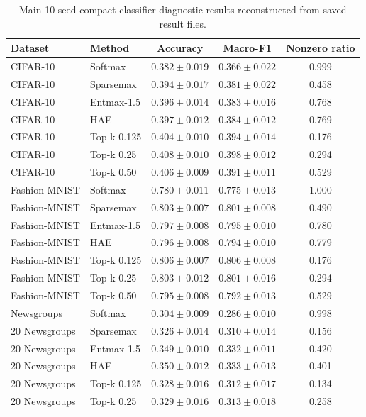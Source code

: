 \begin{table}[!t]
\centering
\small
\caption{Main 10-seed compact-classifier diagnostic results reconstructed from saved result files.}
\label{tab:main-results}
\begin{tabular}{@{}llccc@{}}
\toprule
Dataset & Method & Accuracy & Macro-F1 & Nonzero ratio \\
\midrule
CIFAR-10 & Softmax & $0.382 \pm 0.019$ & $0.366 \pm 0.022$ & 0.999 \\
CIFAR-10 & Sparsemax & $0.394 \pm 0.017$ & $0.381 \pm 0.022$ & 0.458 \\
CIFAR-10 & Entmax-1.5 & $0.396 \pm 0.014$ & $0.383 \pm 0.016$ & 0.768 \\
CIFAR-10 & HAE & $0.397 \pm 0.012$ & $0.384 \pm 0.012$ & 0.769 \\
CIFAR-10 & Top-k 0.125 & $0.404 \pm 0.010$ & $0.394 \pm 0.014$ & 0.176 \\
CIFAR-10 & Top-k 0.25 & $0.408 \pm 0.010$ & $0.398 \pm 0.012$ & 0.294 \\
CIFAR-10 & Top-k 0.50 & $0.406 \pm 0.009$ & $0.391 \pm 0.011$ & 0.529 \\
\addlinespace
Fashion-MNIST & Softmax & $0.780 \pm 0.011$ & $0.775 \pm 0.013$ & 1.000 \\
Fashion-MNIST & Sparsemax & $0.803 \pm 0.007$ & $0.801 \pm 0.008$ & 0.490 \\
Fashion-MNIST & Entmax-1.5 & $0.797 \pm 0.008$ & $0.795 \pm 0.010$ & 0.780 \\
Fashion-MNIST & HAE & $0.796 \pm 0.008$ & $0.794 \pm 0.010$ & 0.779 \\
Fashion-MNIST & Top-k 0.125 & $0.806 \pm 0.007$ & $0.806 \pm 0.008$ & 0.176 \\
Fashion-MNIST & Top-k 0.25 & $0.803 \pm 0.012$ & $0.801 \pm 0.016$ & 0.294 \\
Fashion-MNIST & Top-k 0.50 & $0.795 \pm 0.008$ & $0.792 \pm 0.013$ & 0.529 \\
\addlinespace
20 Newsgroups & Softmax & $0.304 \pm 0.009$ & $0.286 \pm 0.010$ & 0.998 \\
20 Newsgroups & Sparsemax & $0.326 \pm 0.014$ & $0.310 \pm 0.014$ & 0.156 \\
20 Newsgroups & Entmax-1.5 & $0.349 \pm 0.010$ & $0.332 \pm 0.011$ & 0.420 \\
20 Newsgroups & HAE & $0.350 \pm 0.012$ & $0.333 \pm 0.013$ & 0.401 \\
20 Newsgroups & Top-k 0.125 & $0.328 \pm 0.016$ & $0.312 \pm 0.017$ & 0.134 \\
20 Newsgroups & Top-k 0.25 & $0.329 \pm 0.016$ & $0.313 \pm 0.018$ & 0.258 \\

\end{tabular}
\end{table}

